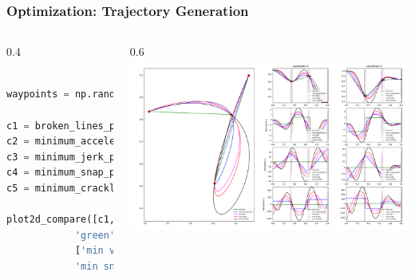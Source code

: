 \begin{frame}[fragile]
	\frametitle{Optimization: Trajectory Generation}
	\begin{columns}
		\begin{column}{0.4\textwidth}
			\begin{lstlisting}[language=python]

waypoints = np.random.rand(4, 2)

c1 = broken_lines_path(waypoints)
c2 = minimum_acceleration_path(waypoints)
c3 = minimum_jerk_path(waypoints)
c4 = minimum_snap_path(waypoints)
c5 = minimum_crackle_path(waypoints)

plot2d_compare([c1, c2, c3, c4, c5], [
            'green', 'blue', 'magenta', 'red', 'black'],
            ['min vel', 'min acceleration', 'min jerk',
            'min snap', 'min crackle'])

    \end{lstlisting}
		\end{column}
		\begin{column}{0.6\textwidth}
			\includegraphics[width=\textwidth]{./images/comparison.png}
		\end{column}
	\end{columns}

\end{frame}

